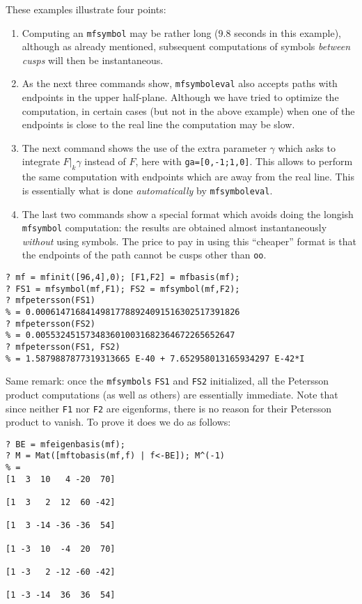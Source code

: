 \documentclass[11pt]{article}
\newcommand{\ga}{\gamma}
\def\kbd#1{{\tt #1}}
\begin{document}
These examples illustrate four points:
\begin{enumerate}\item Computing an \kbd{mfsymbol}
may be rather long ($9.8$ seconds in this example), although as already
mentioned, subsequent computations of symbols \emph{between cusps} will then
be instantaneous.
\item As the next three commands show, \kbd{mfsymboleval}
also accepts paths with endpoints in the upper half-plane. Although we
have tried to optimize the computation, in certain cases (but not in
the above example) when one of the endpoints is close to the real line
the computation may be slow.
\item The next command shows the use of the extra parameter $\ga$ which
asks to integrate $F|_k\ga$ instead of $F$, here with \kbd{ga=[0,-1;1,0]}.
This allows to perform the same computation with endpoints which are away
from the real line. This is essentially what is done \emph{automatically} by
\kbd{mfsymboleval}.
\item The last two commands show a special format which avoids doing the
longish \kbd{mfsymbol} computation: the results are obtained almost
instantaneously \emph{without} using symbols. The price to pay in using this
``cheaper'' format is that the endpoints of the path cannot be cusps other
than \kbd{oo}.
\end{enumerate}

\begin{verbatim}
? mf = mfinit([96,4],0); [F1,F2] = mfbasis(mf);
? FS1 = mfsymbol(mf,F1); FS2 = mfsymbol(mf,F2);
? mfpetersson(FS1)
% = 0.00061471684149817788924091516302517391826
? mfpetersson(FS2)
% = 0.0055324515734836010031682364672265652647
? mfpetersson(FS1, FS2)
% = 1.5879887877319313665 E-40 + 7.652958013165934297 E-42*I
\end{verbatim}

Same remark: once the \kbd{mfsymbols} \kbd{FS1} and \kbd{FS2} initialized,
all the Petersson product computations (as well as others) are essentially
immediate. Note that since neither \kbd{F1} nor \kbd{F2} are eigenforms,
there is no reason for their Petersson product to vanish. To prove it does
we do as follows:

\begin{verbatim}
? BE = mfeigenbasis(mf);
? M = Mat([mftobasis(mf,f) | f<-BE]); M^(-1)
% =
[1  3  10   4 -20  70]

[1  3   2  12  60 -42]

[1  3 -14 -36 -36  54]

[1 -3  10  -4  20  70]

[1 -3   2 -12 -60 -42]

[1 -3 -14  36  36  54]
\end{verbatim}
\end{document}
